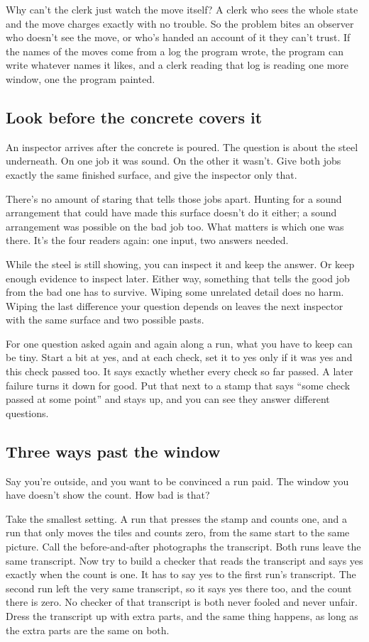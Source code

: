 \documentclass[11pt,twoside]{article}
\theoremstyle{thielethm}
\theoremstyle{thieledef}
\theoremstyle{thieledef}
\theoremstyle{thieledef}
\theoremstyle{thielethm}
\theoremstyle{thieleobs}
\theoremstyle{thielethm}
\begin{document}
Why can't the clerk just watch the move itself? A clerk who sees the whole state and the move charges exactly with no trouble. So the problem bites an observer who doesn't see the move, or who's handed an account of it they can't trust. If the names of the moves come from a log the program wrote, the program can write whatever names it likes, and a clerk reading that log is reading one more window, one the program painted.

\subsection{Look before the concrete covers it}

An inspector arrives after the concrete is poured. The question is about the steel underneath. On one job it was sound. On the other it wasn't. Give both jobs exactly the same finished surface, and give the inspector only that.

There's no amount of staring that tells those jobs apart. Hunting for a sound arrangement that could have made this surface doesn't do it either; a sound arrangement was possible on the bad job too. What matters is which one was there. It's the four readers again: one input, two answers needed.

While the steel is still showing, you can inspect it and keep the answer. Or keep enough evidence to inspect later. Either way, something that tells the good job from the bad one has to survive. Wiping some unrelated detail does no harm. Wiping the last difference your question depends on leaves the next inspector with the same surface and two possible pasts.

For one question asked again and again along a run, what you have to keep can be tiny. Start a bit at yes, and at each check, set it to yes only if it was yes and this check passed too. It says exactly whether every check so far passed. A later failure turns it down for good. Put that next to a stamp that says ``some check passed at some point'' and stays up, and you can see they answer different questions.

\subsection{Three ways past the window}

Say you're outside, and you want to be convinced a run paid. The window you have doesn't show the count. How bad is that?

Take the smallest setting. A run that presses the stamp and counts one, and a run that only moves the tiles and counts zero, from the same start to the same picture. Call the before-and-after photographs the transcript. Both runs leave the same transcript. Now try to build a checker that reads the transcript and says yes exactly when the count is one. It has to say yes to the first run's transcript. The second run left the very same transcript, so it says yes there too, and the count there is zero. No checker of that transcript is both never fooled and never unfair. Dress the transcript up with extra parts, and the same thing happens, as long as the extra parts are the same on both.
\end{document}
